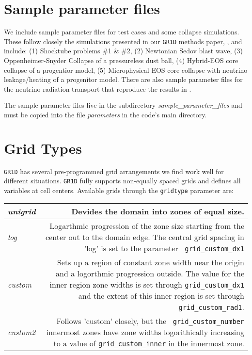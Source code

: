 \documentclass[10pt,nofootinbib]{article}
\newcommand{\code}[1]{\texttt{#1}}
\begin{document}
\section{Sample parameter files}
We include sample parameter files for test cases and some collapse
simulations.  These follow closely the simulations presented in our
\code{GR1D} methods paper, \cite{oconnor:10}, and include: (1)
Shocktube problems \#1 \& \#2, (2) Newtonian Sedov blast wave, (3)
Oppenheimer-Snyder Collapse of a pressureless dust ball, (4)
Hybrid-EOS core collapse of a progentior model, (5) Microphysical EOS
core collapse with neutrino leakage/heating of a progenitor
model. There are also sample parameter files for the neutrino
radiation transport that reproduce the results in \cite{oconnor:14}.

The sample parameter files live in the subdirectory 
\emph{sample\_parameter\_files} and must be copied into the
file \emph{parameters} in the code's main directory. 

\section{Grid Types}
\label{sec:gridtypes}
\code{GR1D} has several pre-programmed grid arrangements we find work
well for different situations.  \code{GR1D} fully supports non-equally
spaced grids and defines all variables at cell centers.  Available
grids through the {\tt gridtype} parameter are:

\begin{tabular}{lr}
\emph{unigrid}&\parbox[t]{13cm}{Devides the domain into zones of equal
  size.}\\ 
\hline
\emph{log}&\parbox[t]{13cm}{Logarthmic progression of the zone size
  starting from the center out to the domain edge.  The central grid
  spacing in 'log' is set to the parameter {\tt
    grid\_custom\_dx1}}\\ 

\hline

\emph{custom}&\parbox[t]{13cm}{Sets up a region of constant zone width
  near the origin and a logorthmic progression outside.  The value for
  the inner region zone widths is set through {\tt grid\_custom\_dx1}
  and the extent of this inner region is set through {\tt
    grid\_custom\_rad1}.}\\

\hline

\emph{custom2}&\parbox[t]{13cm}{Follows 'custom' closely, but the {\tt
    grid\_custom\_number} innermost zones have zone widths
  logorithically increasing to a value of {\tt grid\_custom\_inner} in
  the innermost zone.  }\\

\end{tabular}
\end{document}

